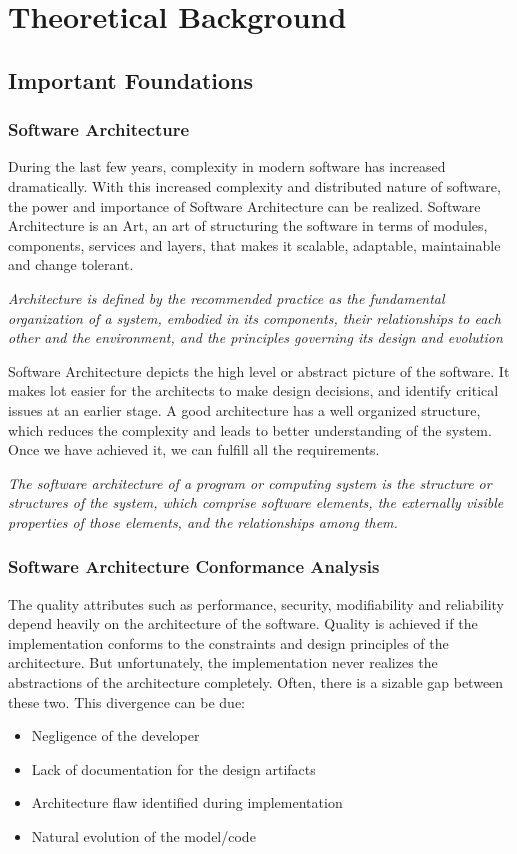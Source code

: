 
\chapter{Theoretical Background}
\section{Important Foundations}
\subsection{Software Architecture}
During the last few years, complexity in modern software has increased dramatically. With this increased complexity and distributed nature of software, the power and importance of Software Architecture can be realized. Software Architecture is an Art, an art of structuring the software in terms of modules, components, services and layers, that makes it scalable, adaptable, maintainable and change tolerant.\newline

\textit{Architecture is defined by the recommended practice as the fundamental organization of a system, embodied in its components, their relationships to each other and the environment, and the principles governing its design and evolution} \cite{architecture_def1} \newline 

Software Architecture depicts the high level or abstract picture of the software. It makes lot easier for the architects to make design decisions, and identify critical issues at an earlier stage. A good  architecture has a well organized structure, which reduces the complexity and leads to better understanding of the system. Once we have achieved it, we can fulfill all the requirements.\newline

\textit{The software architecture of a program or computing system is the structure or structures of the system, which comprise software elements, the externally visible properties of those elements, and the relationships among them.} \cite{architecture_def2}

\subsection{Software Architecture Conformance Analysis}
The quality attributes such as performance, security, modifiability and reliability depend heavily on the architecture of the software. Quality is achieved if the implementation conforms to the constraints and design principles of the architecture. But unfortunately, the implementation never realizes the abstractions of the architecture completely. Often, there is a sizable gap between these two. This divergence can be due: 
\begin{itemize}
\item Negligence of the developer 
\item Lack of documentation for the design artifacts
\item Architecture flaw identified during implementation 
\item Natural evolution of the model/code  
\end{itemize}

